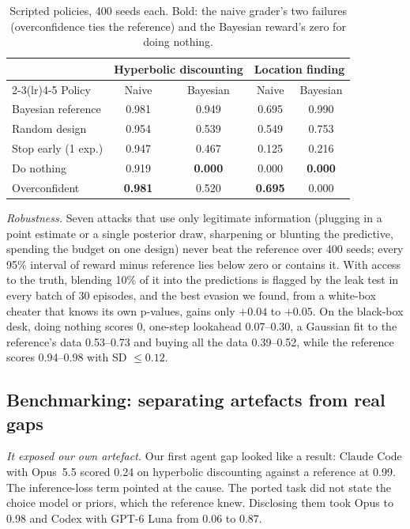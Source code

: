 \documentclass[10pt]{article}
\theoremstyle{definition}
\theoremstyle{remark}
\theoremstyle{plain}
\begin{document}
\begin{table}[t]
\centering\small
\begin{tabular}{lcccc}
\toprule
 & \multicolumn{2}{c}{Hyperbolic discounting} & \multicolumn{2}{c}{Location finding} \\
\cmidrule(lr){2-3}\cmidrule(lr){4-5}
Policy & Naive & Bayesian & Naive & Bayesian \\
\midrule
Bayesian reference    & 0.981 & 0.949 & 0.695 & 0.990 \\
Random design         & 0.954 & 0.539 & 0.549 & 0.753 \\
Stop early (1 exp.)   & 0.947 & 0.467 & 0.125 & 0.216 \\
Do nothing            & 0.919 & \textbf{0.000} & 0.000 & \textbf{0.000} \\
Overconfident         & \textbf{0.981} & 0.520 & \textbf{0.695} & 0.000 \\
\bottomrule
\end{tabular}
\caption{Scripted policies, 400 seeds each. Bold: the naive grader's two failures (overconfidence
ties the reference) and the Bayesian reward's zero for doing nothing.}
\label{tab:e1}
\end{table}

\emph{Robustness.} Seven attacks that use only legitimate information (plugging in a point
estimate or a single posterior draw, sharpening or blunting the predictive, spending the budget on
one design) never beat the reference over 400 seeds; every 95\% interval of reward minus
reference lies below zero or contains it. With access to the truth, blending 10\% of it into the
predictions is flagged by the leak test in every batch of 30 episodes, and the best evasion we
found, from a white-box cheater that knows its own p-values, gains only $+0.04$ to $+0.05$. On the
black-box desk, doing nothing scores 0, one-step lookahead 0.07--0.30, a Gaussian fit to the
reference's data 0.53--0.73 and buying all the data 0.39--0.52, while the reference scores
0.94--0.98 with SD $\le 0.12$.

\subsection{Benchmarking: separating artefacts from real gaps}

\emph{It exposed our own artefact.} Our first agent gap looked like a result: Claude Code with
Opus~5.5 scored 0.24 on hyperbolic discounting against a reference at 0.99. The inference-loss
term pointed at the cause. The ported task did not state the choice model or priors, which the
reference knew. Disclosing them took Opus to 0.98 and Codex with GPT-6 Luna from 0.06 to 0.87.
\end{document}

